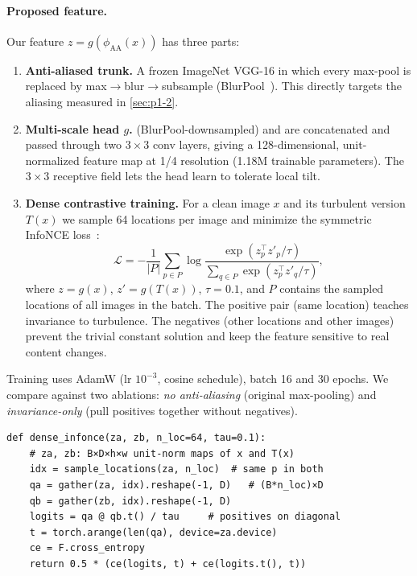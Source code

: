 \documentclass[10pt,twocolumn,letterpaper]{article}
\begin{document}
\paragraph{Proposed feature.}
Our feature $z=g(\phi_{\text{AA}}(x))$ has three parts:
\begin{enumerate}[nosep,leftmargin=*]
\item \textbf{Anti-aliased trunk.} A frozen ImageNet VGG-16 in which every max-pool is replaced by max$\rightarrow$blur$\rightarrow$subsample (BlurPool~\cite{zhang2019blurpool}). This directly targets the aliasing measured in \cref{sec:p1-2}.
\item \textbf{Multi-scale head $g$.}  (BlurPool-downsampled) and  are concatenated and passed through two $3{\times}3$ conv layers, giving a 128-dimensional, unit-normalized feature map at 1/4 resolution (1.18M trainable parameters). The $3{\times}3$ receptive field lets the head learn to tolerate local tilt.
\item \textbf{Dense contrastive training.} For a clean image $x$ and its turbulent version $T(x)$ we sample 64 locations per image and minimize the symmetric InfoNCE loss~\cite{oord2018cpc,wang2021densecl}:
\begin{equation}
\mathcal{L} = -\frac{1}{|P|}\sum_{p\in P}\log\frac{\exp(z_p^{\top}z'_p/\tau)}{\sum_{q\in P}\exp(z_p^{\top}z'_q/\tau)} ,
\end{equation}
where $z=g(x)$, $z'=g(T(x))$, $\tau=0.1$, and $P$ contains the sampled locations of all images in the batch. The positive pair (same location) teaches invariance to turbulence. The negatives (other locations and other images) prevent the trivial constant solution and keep the feature sensitive to real content changes.
\end{enumerate}
Training uses AdamW (lr $10^{-3}$, cosine schedule), batch 16 and 30 epochs. We compare against two ablations: \emph{no anti-aliasing} (original max-pooling) and \emph{invariance-only} (pull positives together without negatives).

\begin{lstlisting}[float=tbp,caption={Dense InfoNCE loss on sampled feature locations.},label={lst:infonce}]
def dense_infonce(za, zb, n_loc=64, tau=0.1):
    # za, zb: B×D×h×w unit-norm maps of x and T(x)
    idx = sample_locations(za, n_loc)  # same p in both
    qa = gather(za, idx).reshape(-1, D)   # (B*n_loc)×D
    qb = gather(zb, idx).reshape(-1, D)
    logits = qa @ qb.t() / tau     # positives on diagonal
    t = torch.arange(len(qa), device=za.device)
    ce = F.cross_entropy
    return 0.5 * (ce(logits, t) + ce(logits.t(), t))
\end{lstlisting}
\end{document}
